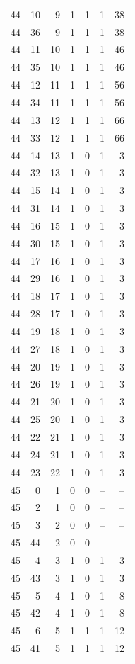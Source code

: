 \begin{longtable}{rrrrrrr}
44 & 10 & 9 & 1 & 1 & 1 & 38\\
44 & 36 & 9 & 1 & 1 & 1 & 38\\
44 & 11 & 10 & 1 & 1 & 1 & 46\\
44 & 35 & 10 & 1 & 1 & 1 & 46\\
44 & 12 & 11 & 1 & 1 & 1 & 56\\
44 & 34 & 11 & 1 & 1 & 1 & 56\\
44 & 13 & 12 & 1 & 1 & 1 & 66\\
44 & 33 & 12 & 1 & 1 & 1 & 66\\
44 & 14 & 13 & 1 & 0 & 1 & 3\\
44 & 32 & 13 & 1 & 0 & 1 & 3\\
44 & 15 & 14 & 1 & 0 & 1 & 3\\
44 & 31 & 14 & 1 & 0 & 1 & 3\\
44 & 16 & 15 & 1 & 0 & 1 & 3\\
44 & 30 & 15 & 1 & 0 & 1 & 3\\
44 & 17 & 16 & 1 & 0 & 1 & 3\\
44 & 29 & 16 & 1 & 0 & 1 & 3\\
44 & 18 & 17 & 1 & 0 & 1 & 3\\
44 & 28 & 17 & 1 & 0 & 1 & 3\\
44 & 19 & 18 & 1 & 0 & 1 & 3\\
44 & 27 & 18 & 1 & 0 & 1 & 3\\
44 & 20 & 19 & 1 & 0 & 1 & 3\\
44 & 26 & 19 & 1 & 0 & 1 & 3\\
44 & 21 & 20 & 1 & 0 & 1 & 3\\
44 & 25 & 20 & 1 & 0 & 1 & 3\\
44 & 22 & 21 & 1 & 0 & 1 & 3\\
44 & 24 & 21 & 1 & 0 & 1 & 3\\
44 & 23 & 22 & 1 & 0 & 1 & 3\\
45 & 0 & 1 & 0 & 0 & -- & --\\
45 & 2 & 1 & 0 & 0 & -- & --\\
45 & 3 & 2 & 0 & 0 & -- & --\\
45 & 44 & 2 & 0 & 0 & -- & --\\
45 & 4 & 3 & 1 & 0 & 1 & 3\\
45 & 43 & 3 & 1 & 0 & 1 & 3\\
45 & 5 & 4 & 1 & 0 & 1 & 8\\
45 & 42 & 4 & 1 & 0 & 1 & 8\\
45 & 6 & 5 & 1 & 1 & 1 & 12\\
45 & 41 & 5 & 1 & 1 & 1 & 12\\

\end{longtable}
